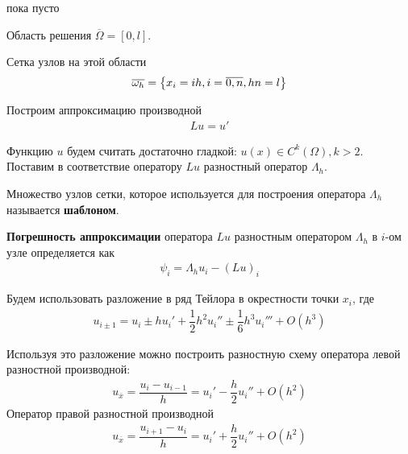 \begin{col-answer-preambule}
	\begin{plan}
    \item пока пусто
	\end{plan}
\end{col-answer-preambule}


Область решения $\overline{\Omega} = [0, l]$.

Сетка узлов на этой области
\begin{align*}
  \overline{\omega_h} = \left\{ x_i = ih, i = \overline{0, n}, hn = l \right\}
\end{align*}

Построим аппроксимацию производной
\begin{align*}
  Lu = u'
\end{align*}

Функцию $u$ будем считать достаточно гладкой: $u(x) \in C^k(\Omega), k > 2$. Поставим
в соответствие оператору $Lu$ разностный оператор $\Lambda_h$.

\begin{definition}
  Множество узлов сетки, которое используется для построения оператора $\Lambda_h$
  называется \textbf{шаблоном}.
\end{definition}

\textbf{Погрешность аппроксимации} оператора $Lu$ разностным оператором $\Lambda_h$
в $i$-ом узле определяется как
\begin{align*}
  \psi_i = \Lambda_hu_i - (Lu)_i
\end{align*}

Будем использовать разложение в ряд Тейлора в окрестности точки $x_i$, где
\begin{align*}
  u_{i\pm 1} = u_i \pm hu_i' + \dfrac{1}{2}h^2u_i'' \pm \dfrac{1}{6}h^3u_i''' + O(h^3)
\end{align*}

Используя это разложение можно построить разностную схему оператора левой разностной
производной:
\begin{align}
  \label{23-left}
  u_{\overline{x}} = \dfrac{u_i - u_{i - 1}}{h} = u_i' - \dfrac{h}{2}u_i'' + O(h^2)
\end{align}
Оператор правой разностной производной
\begin{align}
  \label{23-right}
  u_{\overline{x}} = \dfrac{u_{i + 1} - u_i}{h} = u_i' + \dfrac{h}{2}u_i'' + O(h^2)
\end{align}

